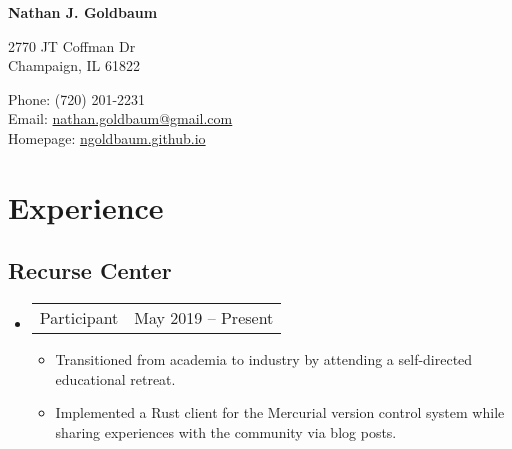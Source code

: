 \documentclass[10pt,letterpaper]{article}
\def\name{Nathan J. Goldbaum}
\newcommand{\textline}[2]{
  \begin{tabularx}{\textwidth}{XY}
  #1 & #2
  \end{tabularx}
}
\begin{document}
{\huge \bf \name}


\bigskip

\begin{minipage}[t]{0.6\textwidth}
  2770 JT Coffman Dr \\
  Champaign, IL 61822
\end{minipage}
\begin{minipage}[t]{0.4\textwidth}
  Phone: (720) 201-2231 \\  %
  Email: \href{mailto:nathan.goldbaum@gmail.com}{nathan.goldbaum@gmail.com} \\
  Homepage: \href{ngoldbaum.github.io}{ngoldbaum.github.io}
\end{minipage}

\section*{Experience}

\subsection*{Recurse Center}
\begin{itemize}
  \item [] \textline{Participant}{May 2019 -- Present}
    \begin{itemize}
      \item Transitioned from academia to industry by attending a
        self-directed educational retreat.
      \item Implemented a Rust client for the Mercurial version control system
        while sharing experiences with the community via blog posts.
    \end{itemize}    
\end{itemize}
\end{document}
